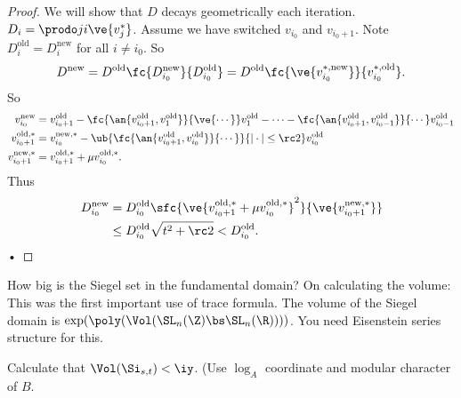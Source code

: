\begin{proof}
We will show that $D$ decays geometrically each iteration. $D_i=\prodo ji \ve{v_j^*}$. Assume we have switched $v_{i_0}$ and $v_{i_0+1}$. Note $D_i^{\text{old}} = D_i^{\text{new}}$ for all $i\ne i_0$. So \begin{align}
D^{\text{new}} = D^{\text{old}} \fc{D_{i_0}^{\text{new}}}{D_{i_0}^{\text{old}}} = D^{\text{old}} \fc{\ve{v_{i_0}^{*,\text{new}}}}{v_{i_0}^{*,\text{old}}}.
\end{align}
So 
\begin{align}
v_{i_0}^{\text{new}}
&= v_{i_0+1}^{\text{old}}
 - \fc{\an{v_{i_0+1}^{\text{old}}, v_1^{\text{old}}}}{\ve{\cdots}} v_1^{\text{old}}- \cdots - \fc{\an{v_{i_0+1}^{\text{old}}, v_{i_0-1}^{\text{old}}}}{\cdots} v_{i_0-1}^{\text{old}}\\
 v_{i_0+1}^{\text{old},*} &=
v_{i_0}^{\text{new},*} - 
\ub{\fc{\an{v_{i_0+1}^{\text{old}}, v_{i_0}^{\text{old}}}}{\cdots}}{|\cdot|\le \rc 2}
v_{i_0}^{\text{old}}\\
v_{i_0+1}^{\text{new},*} &= v_{i_0+1}^{\text{old},*} + \mu v_{i_0}^{\text{old},*}.
\end{align}
Thus
\begin{align}
D_{i_0}^{\text{new}} &
= D_{i_0}^{\text{old}} \sfc{\ve{v_{i_0+1}^{\text{old},*} + \mu v_{i_0}^{\text{old},*}}^2}{\ve{v_{i_0+1}^{\text{new},*}}}\\
&\le D_{i_0}^{\text{old}} \sqrt{t^2 + \rc 2}<D_{i_0}^{\text{old}}.
\end{align}•

\end{proof}

How big is the Siegel set in the fundamental domain? 
On calculating the volume:
This was the first important use of trace formula. %
The volume of the Siegel domain is $\exp(\poly(\Vol(\SL_n(\Z)\bs \SL_n(\R))))$. You need Eisenstein series structure for this. 

\begin{exr}
Calculate that $\Vol(\Si_{s,t})<\iy$. (Use $\log_A$ coordinate and modular character of $B$.
\end{exr}
